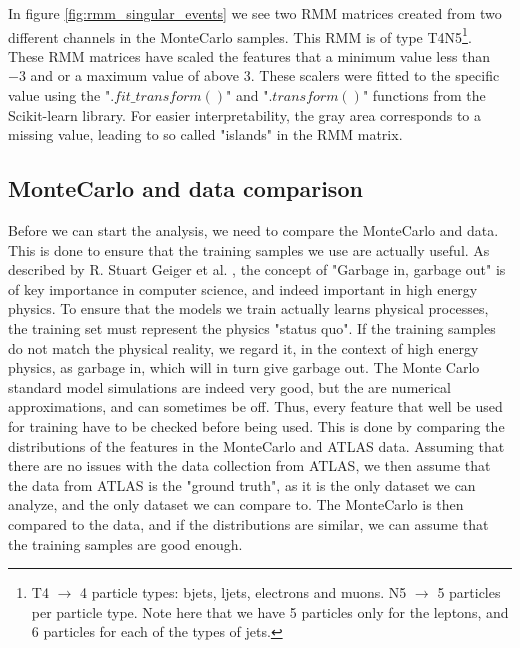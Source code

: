 In figure \ref{fig:rmm_singular_events} we see two RMM matrices created from two different channels in the MonteCarlo samples. 
This RMM is of type T4N5\footnote{T4 $\to$ 4 particle types: bjets, ljets, electrons and muons. N5 $\to$ 5 particles per 
particle type. Note here that we have 5 particles only for the leptons, and 6 particles for each of the types of jets.}. 
These RMM matrices have scaled the features that a minimum value less than $-3$ and or a maximum value of above $3$. These 
scalers were fitted to the specific value using the "$.fit\_transform()$" and "$.transform()$" functions from the 
Scikit-learn library\cite{scikit-learn}. For easier interpretability, the gray area corresponds to a missing value, 
leading to so called "islands" in the RMM matrix.


\subsection*{MonteCarlo and data comparison}\label{sec:mcdatacomp}

Before we can start the analysis, we need to compare the MonteCarlo and data. This is done to ensure that the training samples we 
use are actually useful. As described by R. Stuart Geiger et al. \cite{DBLP:journals/corr/abs-2107-02278}, the concept of "Garbage 
in, garbage out" is of key importance in computer science, and indeed important in high energy physics. To ensure that the models 
we train actually learns physical processes, the training set must represent the physics "status quo". If the training samples do 
not match the physical reality, we regard it, in the context of high energy physics, as garbage in, which will in turn give 
garbage out. The Monte Carlo standard model simulations are indeed very good, but the are numerical approximations, and can 
sometimes be off. Thus, every feature that well be used for training have to be checked before being used. This is done by 
comparing the distributions of the features in the MonteCarlo and ATLAS data. Assuming that there are no issues with the data 
collection from ATLAS, we then assume that the data from ATLAS is the "ground truth", as it is the only dataset we can analyze, 
and the only dataset we can compare to. The MonteCarlo is then compared to the data, and if the distributions are similar, 
we can assume that the training samples are good enough. 


